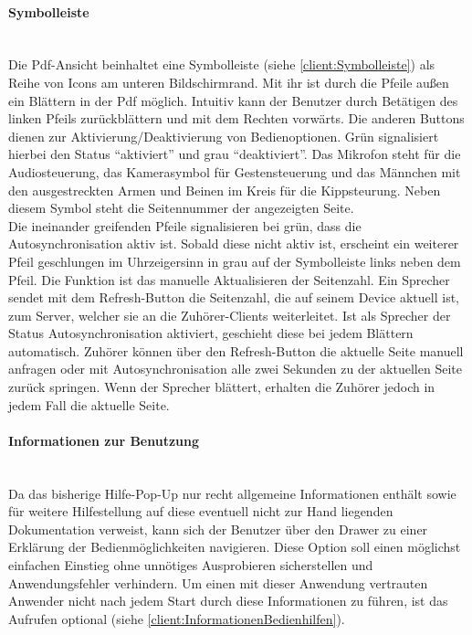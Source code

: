 \paragraph{Symbolleiste}$\;$\\
Die Pdf-Ansicht beinhaltet eine Symbolleiste (siehe \autoref{client:Symbolleiste}) als Reihe von Icons am unteren Bildschirmrand. Mit ihr ist durch die Pfeile außen ein Blättern in der Pdf möglich. Intuitiv  kann der Benutzer durch Betätigen des linken Pfeils zurückblättern und mit dem Rechten vorwärts. Die anderen Buttons dienen zur Aktivierung/Deaktivierung von Bedienoptionen. Grün signalisiert hierbei den Status "`aktiviert"' und grau "`deaktiviert"'. Das Mikrofon steht für die Audiosteuerung, das Kamerasymbol für  Gestensteuerung und das Männchen mit den ausgestreckten Armen und Beinen im Kreis für die Kippsteurung. Neben diesem Symbol steht die Seitennummer der angezeigten Seite.
\\Die ineinander greifenden Pfeile signalisieren bei grün, dass die Autosynchronisation aktiv ist. Sobald diese nicht aktiv ist, erscheint ein weiterer Pfeil geschlungen im Uhrzeigersinn in grau auf der Symbolleiste links neben dem Pfeil. Die Funktion ist das manuelle Aktualisieren der Seitenzahl. Ein Sprecher sendet mit dem Refresh-Button die Seitenzahl, die auf seinem Device aktuell ist, zum Server, welcher sie an die Zuhörer-Clients weiterleitet. Ist als Sprecher der Status Autosynchronisation aktiviert, geschieht diese bei jedem Blättern automatisch. Zuhörer können über den Refresh-Button die aktuelle Seite manuell anfragen oder mit Autosynchronisation alle zwei Sekunden zu der aktuellen Seite zurück springen. Wenn der Sprecher blättert, erhalten die Zuhörer jedoch in jedem Fall die aktuelle Seite.

\paragraph{Informationen zur Benutzung}$\;$\\
Da das bisherige Hilfe-Pop-Up nur recht allgemeine Informationen enthält sowie für weitere Hilfestellung auf diese eventuell nicht zur Hand liegenden Dokumentation verweist, kann sich der Benutzer über den Drawer zu einer Erklärung der Bedienmöglichkeiten navigieren. Diese Option soll einen möglichst einfachen Einstieg ohne unnötiges Ausprobieren sicherstellen und Anwendungsfehler verhindern. Um einen mit dieser Anwendung vertrauten Anwender nicht nach jedem Start durch diese Informationen zu führen, ist das Aufrufen optional (siehe \autoref{client:InformationenBedienhilfen}).

